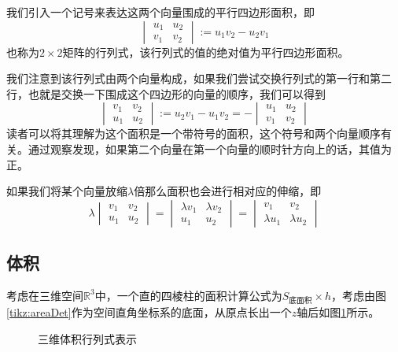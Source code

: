 我们引入一个记号来表达这两个向量围成的平行四边形面积，即$$\begin{vmatrix}
	u_1&u_2 \\
	v_1&v_2
\end{vmatrix}:=u_1v_2-u_2v_1$$也称为$2\times 2$矩阵的行列式，该行列式的值的绝对值为平行四边形面积。

我们注意到该行列式由两个向量构成，如果我们尝试交换行列式的第一行和第二行，也就是交换一下围成这个四边形的向量的顺序，我们可以得到$$\begin{vmatrix}
	v_1&v_2 \\
	u_1&u_2
\end{vmatrix}:=u_2v_1-u_1v_2=-\begin{vmatrix}
	u_1&u_2 \\
	v_1&v_2
\end{vmatrix}$$读者可以将其理解为这个面积是一个带符号的面积，这个符号和两个向量顺序有关。通过观察发现，如果第二个向量在第一个向量的顺时针方向上的话，其值为正。

如果我们将某个向量放缩$\lambda$倍那么面积也会进行相对应的伸缩，即$$\lambda\begin{vmatrix}
	v_1&v_2 \\
	u_1&u_2
\end{vmatrix}=\begin{vmatrix}
	\lambda v_1& \lambda v_2 \\
	u_1&u_2
\end{vmatrix}=\begin{vmatrix}
	v_1&v_2 \\
	\lambda u_1&\lambda u_2
\end{vmatrix}$$

\subsection{体积}

考虑在三维空间$\mathbb{R}^3$中，一个直的四棱柱的面积计算公式为$S_{\text{底面积}}\times h$，考虑由图\ref{tikz:areaDet}作为空间直角坐标系的底面，从原点长出一个$z$轴后如图\ref{tikz:areaDet3d}所示。

\begin{figure}[htbp]
	\centering
	
	\caption{三维体积行列式表示}
	\label{tikz:areaDet3d}
\end{figure}

